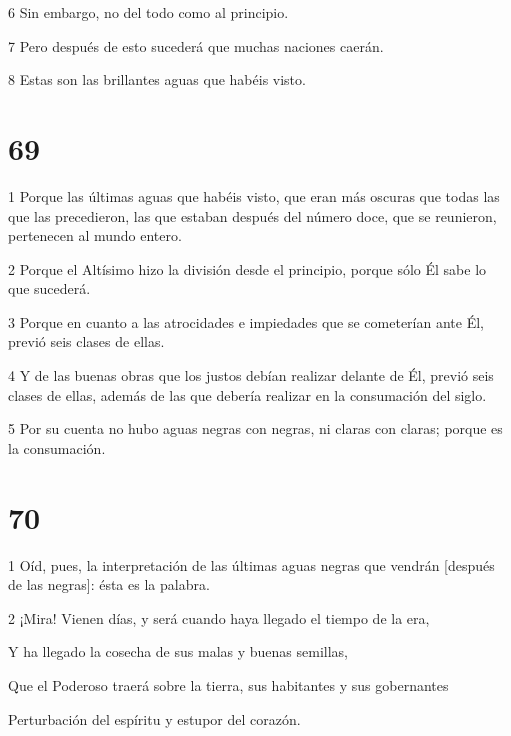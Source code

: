 \par 6 Sin embargo, no del todo como al principio.

\par 7 Pero después de esto sucederá que muchas naciones caerán.

\par 8 Estas son las brillantes aguas que habéis visto.

\chapter{69}

\par 1 Porque las últimas aguas que habéis visto, que eran más oscuras que todas las que las precedieron, las que estaban después del número doce, que se reunieron, pertenecen al mundo entero.

\par 2 Porque el Altísimo hizo la división desde el principio, porque sólo Él sabe lo que sucederá.

\par 3 Porque en cuanto a las atrocidades e impiedades que se cometerían ante Él, previó seis clases de ellas.

\par 4 Y de las buenas obras que los justos debían realizar delante de Él, previó seis clases de ellas, además de las que debería realizar en la consumación del siglo.

\par 5 Por su cuenta no hubo aguas negras con negras, ni claras con claras; porque es la consumación.

\chapter{70}

\par 1 Oíd, pues, la interpretación de las últimas aguas negras que vendrán [después de las negras]: ésta es la palabra.

\par 2 ¡Mira! Vienen días, y será cuando haya llegado el tiempo de la era,

Y ha llegado la cosecha de sus malas y buenas semillas,

\par Que el Poderoso traerá sobre la tierra, sus habitantes y sus gobernantes

\par Perturbación del espíritu y estupor del corazón.

